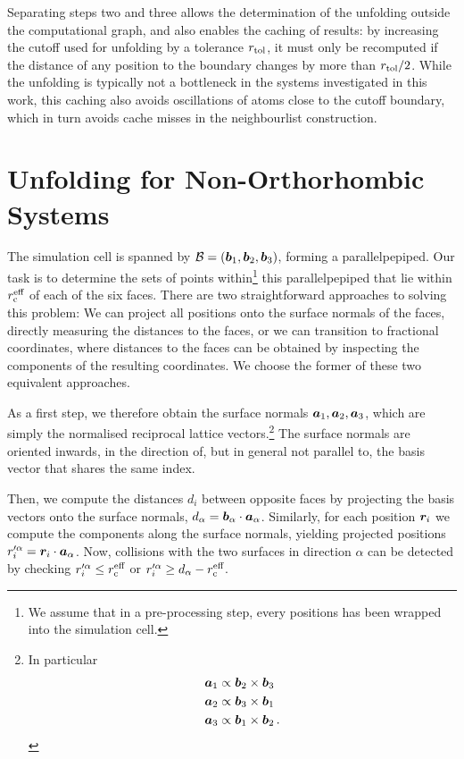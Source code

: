 Separating steps two and three allows the determination of the unfolding outside the computational graph, and also enables the caching of results: by increasing the cutoff used for unfolding by a tolerance $r_{\text{tol}}$, it must only be recomputed if the distance of any position to the boundary changes by more than $r_{\text{tol}}/2$. While the unfolding is typically not a bottleneck in the systems investigated in this work, this caching also avoids oscillations of atoms close to the cutoff boundary, which in turn avoids cache misses in the neighbourlist construction.

\section{Unfolding for Non-Orthorhombic Systems}
\label{sec:si-unf-triclinic}

The simulation cell is spanned by $\mathcal{B} = (\boldsymbol{b}_1, \boldsymbol{b}_2, \boldsymbol{b}_3)$, forming a parallelpepiped. Our task is to determine the sets of points within\footnote{We assume that in a pre-processing step, every positions has been wrapped into the simulation cell.} this parallelpepiped that lie within $r_{\text{c}}^{\text{eff}}$ of each of the six faces. There are two straightforward approaches to solving this problem: We can project all positions onto the surface normals of the faces, directly measuring the distances to the faces, or we can transition to fractional coordinates, where distances to the faces can be obtained by inspecting the components of the resulting coordinates. We choose the former of these two equivalent approaches.

As a first step, we therefore obtain the surface normals $\boldsymbol{a}_1, \boldsymbol{a}_2, \boldsymbol{a}_3$, which are simply the normalised reciprocal lattice vectors.\footnote{
  In particular
  \begin{align*}
    \boldsymbol{a}_1 &\propto \boldsymbol{b}_2 \times \boldsymbol{b}_3 \\
    \boldsymbol{a}_2 &\propto \boldsymbol{b}_3 \times \boldsymbol{b}_1 \\
    \boldsymbol{a}_3 &\propto \boldsymbol{b}_1 \times \boldsymbol{b}_2 \, .
\end{align*}
}
The surface normals are oriented inwards, in the direction of, but in general not parallel to, the basis vector that shares the same index.

Then, we compute the distances $d_i$ between opposite faces by projecting the basis vectors onto the surface normals, $d_\alpha = \boldsymbol{b}_\alpha \cdot \boldsymbol{a}_\alpha$. 
Similarly, for each position $\boldsymbol{r}_i$ we compute the components along the surface normals, yielding projected positions $r'^{\alpha}_i = \boldsymbol{r}_i \cdot \boldsymbol{a}_\alpha$.
Now, collisions with the two surfaces in direction $\alpha$ can be detected by checking $r'^{\alpha}_i \leq r_{\text{c}}^{\text{eff}}$ or $r'^{\alpha}_i \geq d_\alpha - r_{\text{c}}^{\text{eff}}$.

